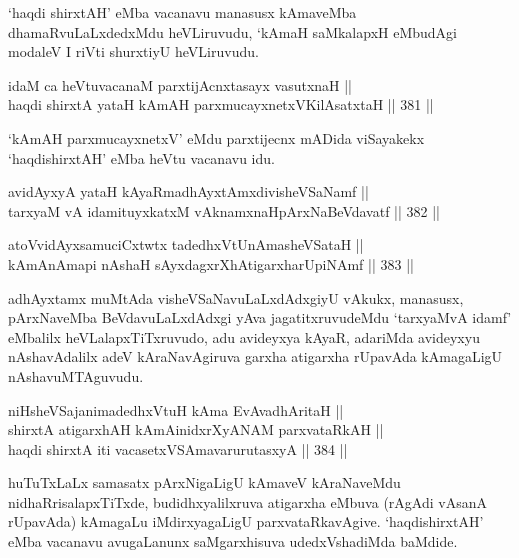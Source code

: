 \begin{artha}
`haqdi shirxtAH' eMba vacanavu manasusx kAmaveMba dhamaRvuLaLxdedxMdu
heVLiruvudu, `kAmaH saMkalapxH eMbudAgi modaleV I riVti shurxtiyU
heVLiruvudu.
\end{artha}

\begin{shl}
idaM ca heVtuvacanaM parxtijAcnxtasayx vasutxnaH || \\
haqdi shirxtA yataH kAmAH parxmucayxnetxV\s KilAsatxtaH \hfill || 381 ||  
\end{shl}

\begin{artha}
`kAmAH parxmucayxnetxV' eMdu parxtijecnx mADida viSayakekx
`haqdishirxtAH' eMba heVtu vacanavu idu.
\end{artha}

\begin{shl}
avidAyxyA yataH kAyaRmadhAyxtAmxdivisheVSaNamf || \\
tarxyaM vA idamituyxkatxM vAknamxnaHpArxNaBeVdavatf \hfill || 382 ||  
\end{shl}

\begin{shl}
atoV\s vidAyxsamuciCxtwtx tadedhxVtUnAmasheVSataH || \\
kAmAnAmapi nAshaH sAyxdagxrXhAtigarxharUpiNAmf \hfill || 383 ||  
\end{shl}

\begin{artha}
adhAyxtamx muMtAda visheVSaNavuLaLxdAdxgiyU vAkukx, manasusx,
pArxNaveMba BeVdavuLaLxdAdxgi yAva jagatitxruvudeMdu `tarxyaMvA idamf'
eMbalilx heVLalapxTiTxruvudo, adu avideyxya kAyaR, adariMda avideyxyu
nAshavAdalilx adeV kAraNavAgiruva garxha atigarxha rUpavAda
kAmagaLigU nAshavuMTAguvudu.
\end{artha}

\begin{shl}
niHsheVSajanimadedhxVtuH kAma EvAvadhAritaH || \\
shirxtA atigarxhAH kAmAinidxrXyANAM parxvataRkAH || \\
haqdi shirxtA iti vacasetxVSAmavarurutasxyA \hfill || 384 ||  
\end{shl}

\begin{artha}
huTuTxLaLx samasatx pArxNigaLigU kAmaveV kAraNaveMdu
nidhaRrisalapxTiTxde, budidhxyalilxruva atigarxha eMbuva (rAgAdi
vAsanA rUpavAda) kAmagaLu iMdirxyagaLigU
parxvataRkavAgive. `haqdishirxtAH' eMba vacanavu avugaLanunx
saMgarxhisuva udedxVshadiMda baMdide. 
\end{artha}

